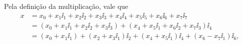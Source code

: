 Pela definição da multiplicação, vale que
	\begin{align*}
	x &= x_0 + x_1\ii_1 + x_2\ii_2 + x_3\ii_3 + x_4\ii_4 + x_5\ii_5 + x_6\ii_6 + x_7\ii_7 \\
		&= (x_0 + x_1\ii_1 + x_2\ii_2 + x_3\ii_3) + (x_4 + x_5\ii_1 + x_6\ii_2 + x_7\ii_3)\ii_4 \\
		&= (x_0 + x_1\ii_1) + (x_2 + x_3\ii_1)\ii_2 + (x_4 + x_5\ii_1)\ii_4 + (x_6 - x_7\ii_1)\ii_6 ,
	\end{align*}



